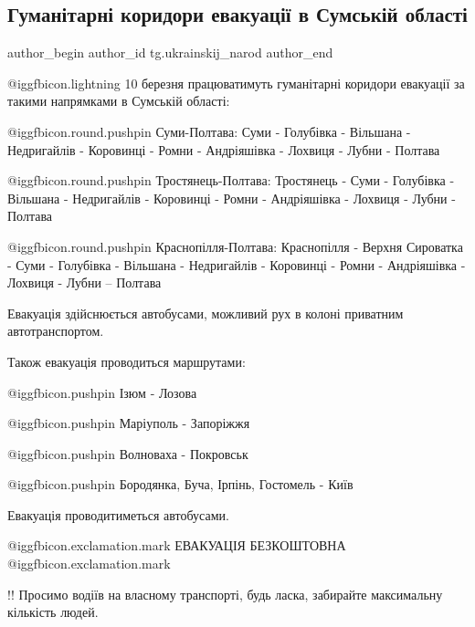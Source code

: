  
 
 
 
 
 
\subsection{Гуманітарні коридори евакуації в Сумській області}
\label{sec:10_03_2022.tg.ukrainskij_narod.1.gumanitarni_korydory_sumska_oblast}
 
\ifcmt
 author_begin
   author_id tg.ukrainskij_narod
 author_end
\fi

@igg{fbicon.lightning} ️10 березня працюватимуть гуманітарні коридори евакуації за такими напрямками
в Сумській області:

@igg{fbicon.round.pushpin}  Суми-Полтава: Суми - Голубівка - Вільшана - Недригайлів - Коровинці - Ромни
- Андріяшівка - Лохвиця - Лубни - Полтава 

@igg{fbicon.round.pushpin}  Тростянець-Полтава: Тростянець - Суми - Голубівка - Вільшана - Недригайлів -
Коровинці - Ромни - Андріяшівка - Лохвиця - Лубни - Полтава 

@igg{fbicon.round.pushpin}  Краснопілля-Полтава: Краснопілля - Верхня Сироватка - Суми - Голубівка -
Вільшана - Недригайлів - Коровинці - Ромни - Андріяшівка - Лохвиця - Лубни –
Полтава

Евакуація здійснюється автобусами, можливий рух в колоні приватним
автотранспортом. 

Також евакуація проводиться маршрутами:

@igg{fbicon.pushpin}  Ізюм - Лозова

@igg{fbicon.pushpin}  Маріуполь - Запоріжжя

@igg{fbicon.pushpin}  Волноваха - Покровськ

@igg{fbicon.pushpin}  Бородянка, Буча, Ірпінь, Гостомель - Київ

Евакуація проводитиметься автобусами. 

@igg{fbicon.exclamation.mark} ЕВАКУАЦІЯ БЕЗКОШТОВНА @igg{fbicon.exclamation.mark}

!! Просимо водіїв на власному транспорті, будь ласка, забирайте максимальну
кількість людей.
